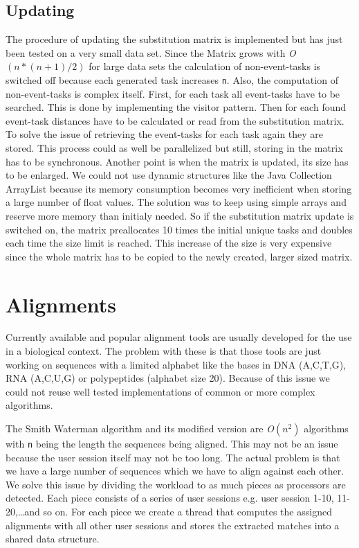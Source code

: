 \subsection{Updating}
	The procedure of updating the substitution matrix is implemented but has just been tested on a very small data set.
	Since the Matrix grows with \textit{O}$(n*(n+1)/2)$ for large data sets the calculation of non-event-tasks is switched off because each generated task increases \texttt{n}.
	Also, the computation of non-event-tasks is complex itself.
	First, for each task all event-tasks have to be searched. This is done by implementing the visitor pattern.
	Then for each found event-task distances have to be calculated or read from the substitution matrix.
	To solve the issue of retrieving the event-tasks for each task again they are stored.
	This process could as well be parallelized but still, storing in the matrix has to be synchronous.
	Another point is when the matrix is updated, its size has to be enlarged.
	We could not use dynamic structures like the Java Collection ArrayList because its memory consumption becomes very inefficient when storing a large number of
	float values. The solution was to keep using simple arrays and reserve more memory than initialy needed.
	So if the substitution matrix update is switched on, the matrix preallocates 10 times the initial unique tasks and doubles each time the size limit is reached.
	This increase of the size is very expensive since the whole matrix has to be copied to the newly created, larger sized matrix.

\section{Alignments}
Currently available and popular alignment tools are usually developed for the use in a biological context.
The problem with these is that those tools are just working on sequences with a limited alphabet like the bases in DNA (A,C,T,G), RNA (A,C,U,G) or polypeptides (alphabet size 20).
Because of this issue we could not reuse well tested implementations of common or more complex algorithms.

The Smith Waterman algorithm and its modified version are \textit{O}$(n^2)$ algorithms with \texttt{n} being the length the sequences being aligned.
This may not be an issue because the user session itself may not be too long.
The actual problem is that we have a large number of sequences which we have to align against each other.
We solve this issue by dividing the workload to as much pieces as processors are detected. Each piece consists of a series of user sessions e.g. user session 1-10, 11-20,\ldots and so on.
For each piece we create a thread that computes the assigned alignments with all other user sessions and stores the extracted matches into a shared data structure.


